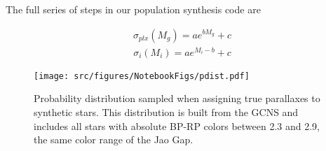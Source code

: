 The full series of steps in our population synthesis code are


\begin{align}\label{eqn:plxCalib}
	\sigma_{plx}(M_{g}) = ae^{bM_{g}}+c
\end{align}
\begin{align}\label{eqn:MagCalib}
	\sigma_{i}(M_{i}) = ae^{M_{i}-b}+c
\end{align}

\begin{figure}
	\centering
	\texttt{[image: src/figures/NotebookFigs/pdist.pdf]}
	\caption{Probability distribution sampled when assigning true parallaxes to
	synthetic stars. This distribution is built from the GCNS and includes all
	stars with absolute BP-RP colors between 2.3 and 2.9, the same color range
	of the Jao Gap.}
	\label{fig:pdist}
\end{figure}

